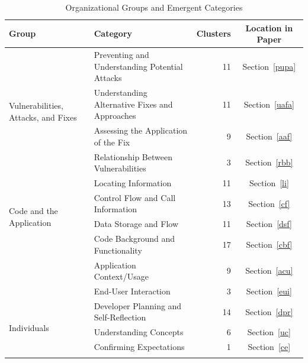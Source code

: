 \documentclass{acm_proc_article-sp}
\begin{document}
\begin{table} 
\centering
\caption{Organizational Groups and Emergent Categories}
\begin{tabularx}{\textwidth}{|l|X|r|c|}
\rowcolor{gray!50}
\hline
    Group											& Category										& Clusters		& Location in Paper	  	\\
    \hline			
    \multirow{4}{*}{Vulnerabilities, Attacks, and Fixes}
        											& Preventing and Understanding Potential Attacks	& 11     		& Section~\ref{pupa}		\\
        											
        											& Understanding Alternative Fixes and Approaches	& 11     		& Section~\ref{uafa}	\\

    												& Assessing the Application of the Fix				& 9     		& Section~\ref{aaf}				\\

    												& Relationship Between Vulnerabilities							& 3     		& Section~\ref{rbb}			\\
    \hline
    \multirow{4}{*}{Code and the Application}	
    												& Locating Information 								& 11      		& Section~\ref{li}		\\

    												& Control Flow and Call Information					& 13     		& Section~\ref{cf}	\\

    												& Data Storage and Flow								& 11     		& Section~\ref{dsf}  	\\

    												& Code Background and Functionality	 				& 17     		& Section~\ref{cbf}			\\

    									& Application Context/Usage										& 9     		& Section~\ref{acu}			\\

    									& End-User Interaction											& 3     		& Section~\ref{eui}		\\
    \hline	
    \multirow{4}{*}{Individuals}	
    									& Developer Planning and Self-Reflection						& 14    		& Section~\ref{dpr}		\\

    									& Understanding Concepts										& 6 			& Section~\ref{uc}			\\

    									& Confirming Expectations					 					& 1				& Section~\ref{ce}  \\
    \hline
	\multirow{4}{*}{Problem Solving Support}


\end{tabularx}
\end{table}
\end{document}

